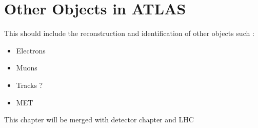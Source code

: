 \newpage
\chapter{Other Objects in ATLAS}
\label{Jet}

This should include the reconstruction and identification of other objects such :
\begin{itemize}
    \item Electrons 
    \item Muons 
    \item Tracks ?
    \item MET
\end{itemize}

This chapter will be merged with detector chapter and LHC